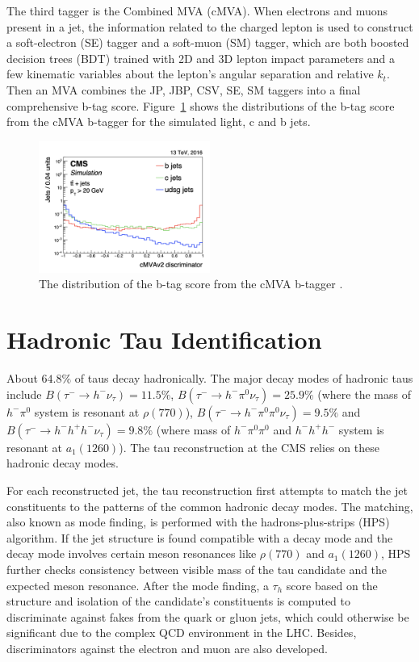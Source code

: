 The third tagger is the Combined MVA (cMVA). When electrons and muons present in a jet, the information related to the charged lepton is used to construct a soft-electron (SE) tagger and a soft-muon (SM) tagger, which are both boosted decision trees (BDT) trained with 2D and 3D lepton impact parameters and a few kinematic variables about the lepton's angular separation and relative $k_t$. Then an MVA combines the JP, JBP, CSV, SE, SM taggers into a final comprehensive b-tag score. Figure~\ref{fig:cmsexperiment:reconstruction:cMVA} shows the distributions of the b-tag score from the cMVA b-tagger for the simulated light, c and b jets.

\begin{figure}[ht]
    \centering
    \includegraphics[width=0.5\textwidth]{chapters/CMSExperiment/sectionReconstruction/figures/cMVA}
    \caption{The distribution of the b-tag score from the cMVA b-tagger \cite{Sirunyan:2017ezt}. }
    \label{fig:cmsexperiment:reconstruction:cMVA}
\end{figure}





\section{Hadronic Tau Identification}

About $64.8\%$ of taus decay hadronically. The major decay modes of hadronic taus include $B(\tau^- \to h^- \nu_\tau)=11.5\% $, $B(\tau^- \to h^- \pi^0 \nu_\tau)=25.9\% $ (where the mass of $h^-\pi^0$ system is resonant at $\rho(770)$), $B(\tau^- \to h^- \pi^0 \pi^0 \nu_\tau)=9.5\% $ and $B(\tau^- \to h^- h^+ h^- \nu_\tau)=9.8\% $ (where mass of $h^- \pi^0 \pi^0$ and $h^- h^+ h^- $ system is resonant at $a_1(1260)$). The tau reconstruction at the CMS relies on these hadronic decay modes.

For each reconstructed jet, the tau reconstruction first attempts to match the jet constituents to the patterns of the common hadronic decay modes. The matching, also known as mode finding, is performed with the hadrons-plus-strips (HPS) algorithm. If the jet structure is found compatible with a decay mode and the decay mode involves certain meson resonances like $\rho(770)$ and $a_1(1260)$, HPS further checks consistency between visible mass of the tau candidate and the expected meson resonance. After the mode finding, a $\tau_h$ score based on the structure and isolation of the candidate's constituents is computed to discriminate against fakes from the quark or gluon jets, which could otherwise be significant due to the complex QCD environment in the LHC. Besides, discriminators against the electron and muon are also developed.


